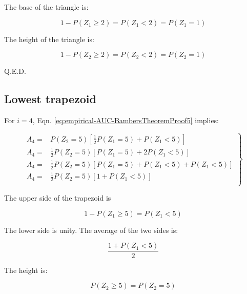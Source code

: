 \documentclass[
]{book}
\begin{document}
The base of the triangle is:

\begin{equation}
1 - P\left ( Z_1 \geq 2 \right )=P\left ( Z_1 < 2 \right )=P\left ( Z_1 = 1 \right )
\end{equation}

The height of the triangle is:

\begin{equation}
1 - P\left ( Z_2 \geq 2 \right )=P\left ( Z_2 < 2 \right )=P\left ( Z_2 = 1 \right )
\end{equation}

Q.E.D.

\hypertarget{lowest-trapezoid}{%
\subsection{Lowest trapezoid}\label{lowest-trapezoid}}

For \(i = 4\), Eqn. \eqref{eq:empirical-AUC-BambersTheoremProof5} implies:

\begin{equation}
\left.
\begin{aligned}
A_4 =& P\left ( Z_2=5 \right )\left [ \frac{1}{2}P\left ( Z_1=5 \right ) + P\left ( Z_1<5 \right )\right ] \\
A_4 =& \frac{1}{2}P\left ( Z_2=5 \right )\left [ P\left ( Z_1=5 \right ) + 2P\left ( Z_1<5 \right )\right ] \\
A_4 =& \frac{1}{2}P\left ( Z_2=5 \right )\left [ P\left ( Z_1=5 \right ) +P\left ( Z_1<5 \right ) + P\left ( Z_1<5 \right )\right ] \\
A_4 =& \frac{1}{2}P\left ( Z_2=5 \right )\left [ 1 + P\left ( Z_1<5 \right )\right ] \\
\end{aligned}
\right \}
\end{equation}

The upper side of the trapezoid is

\begin{equation}
1-P\left ( Z_1 \geq 5 \right )= P\left ( Z_1 < 5 \right )
\end{equation}

The lower side is unity. The average of the two sides is:

\begin{equation}
\frac{1 + P\left ( Z_1 < 5 \right )}{2}
\end{equation}

The height is:

\begin{equation}
P\left ( Z_2 \geq 5 \right ) = P\left ( Z_2 = 5 \right )
\end{equation}
\end{document}

